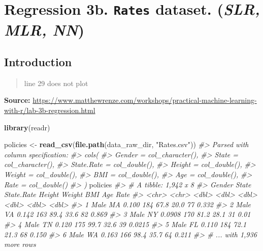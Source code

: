 \documentclass[]{book}
\newenvironment{Shaded}{\begin{snugshade}}{\end{snugshade}}
\newcommand{\CommentTok}[1]{\textcolor[rgb]{0.56,0.35,0.01}{\textit{#1}}}
\newcommand{\KeywordTok}[1]{\textcolor[rgb]{0.13,0.29,0.53}{\textbf{#1}}}
\newcommand{\NormalTok}[1]{#1}
\newcommand{\StringTok}[1]{\textcolor[rgb]{0.31,0.60,0.02}{#1}}
\begin{document}
\hypertarget{regression-3b.-rates-dataset.-slr-mlr-nn}{%
\chapter{\texorpdfstring{Regression 3b. \texttt{Rates} dataset. (\emph{SLR, MLR, NN})}{Regression 3b. Rates dataset. (SLR, MLR, NN)}}\label{regression-3b.-rates-dataset.-slr-mlr-nn}}

\hypertarget{introduction-2}{%
\section{Introduction}\label{introduction-2}}

\begin{quote}
line 29 does not plot
\end{quote}

\textbf{Source:} \url{https://www.matthewrenze.com/workshops/practical-machine-learning-with-r/lab-3b-regression.html}

\begin{Shaded}
\begin{Highlighting}[]
\KeywordTok{library}\NormalTok{(readr)}

\NormalTok{policies <-}\StringTok{ }\KeywordTok{read_csv}\NormalTok{(}\KeywordTok{file.path}\NormalTok{(data_raw_dir, }\StringTok{"Rates.csv"}\NormalTok{))}
\CommentTok{#> Parsed with column specification:}
\CommentTok{#> cols(}
\CommentTok{#>   Gender = col_character(),}
\CommentTok{#>   State = col_character(),}
\CommentTok{#>   State.Rate = col_double(),}
\CommentTok{#>   Height = col_double(),}
\CommentTok{#>   Weight = col_double(),}
\CommentTok{#>   BMI = col_double(),}
\CommentTok{#>   Age = col_double(),}
\CommentTok{#>   Rate = col_double()}
\CommentTok{#> )}
\NormalTok{policies}
\CommentTok{#> # A tibble: 1,942 x 8}
\CommentTok{#>   Gender State State.Rate Height Weight   BMI   Age   Rate}
\CommentTok{#>   <chr>  <chr>      <dbl>  <dbl>  <dbl> <dbl> <dbl>  <dbl>}
\CommentTok{#> 1 Male   MA        0.100     184   67.8  20.0    77 0.332 }
\CommentTok{#> 2 Male   VA        0.142     163   89.4  33.6    82 0.869 }
\CommentTok{#> 3 Male   NY        0.0908    170   81.2  28.1    31 0.01  }
\CommentTok{#> 4 Male   TN        0.120     175   99.7  32.6    39 0.0215}
\CommentTok{#> 5 Male   FL        0.110     184   72.1  21.3    68 0.150 }
\CommentTok{#> 6 Male   WA        0.163     166   98.4  35.7    64 0.211 }
\CommentTok{#> # ... with 1,936 more rows}
\end{Highlighting}
\end{Shaded}
\end{document}
